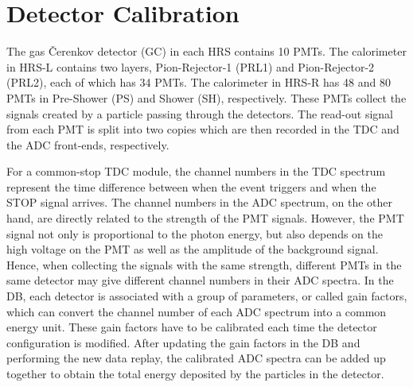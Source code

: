 \section{Detector Calibration}
   The gas \v{C}erenkov detector (GC) in each HRS contains 10 PMTs. The calorimeter in HRS-L contains two layers, Pion-Rejector-1 (PRL1) and Pion-Rejector-2 (PRL2), each of which has 34 PMTs. The calorimeter in HRS-R has 48 and 80 PMTs in Pre-Shower (PS) and Shower (SH), respectively. These PMTs collect the signals created by a particle passing through the detectors. The read-out signal from each PMT is split into two copies which are then recorded in the TDC and the ADC front-ends, respectively.
   
   For a common-stop TDC module, the channel numbers in the TDC spectrum represent the time difference between when the event triggers and when the STOP signal arrives. The channel numbers in the ADC spectrum, on the other hand, are directly related to the strength of the PMT signals. However, the PMT signal not only is proportional to the photon energy, but also depends on the high voltage on the PMT as well as the amplitude of the background signal. Hence, when collecting the signals with the same strength, different PMTs in the same detector may give different channel numbers in their ADC spectra. In the DB, each detector is associated with a group of parameters, or called gain factors, which can convert the channel number of each ADC spectrum into a common energy unit. These gain factors have to be calibrated each time the detector configuration is modified. After updating the gain factors in the DB and performing the new data replay, the calibrated ADC spectra can be added up together to obtain the total energy deposited by the particles in the detector.
 
